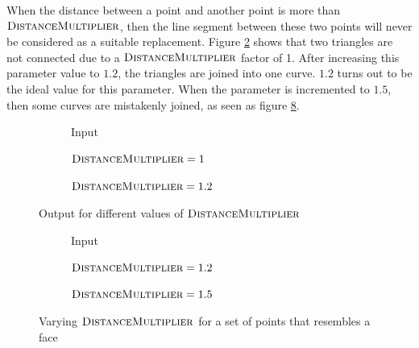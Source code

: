 \documentclass[11pt]{article}
\begin{document}
When the distance between a point and another point is more than $\textsc{DistanceMultiplier}$, then the line segment between these two points will never be considered as a suitable replacement. Figure \ref{fig:exp:multiple_length_factor:1} shows that two triangles are not connected due to a $\textsc{DistanceMultiplier}$ factor of 1. After increasing this parameter value to $1.2$, the triangles are joined into one curve. $1.2$ turns out to be the ideal value for this parameter. When the parameter is incremented to $1.5$, then some curves are mistakenly joined, as seen as figure \ref{fig:exp:multiple_face}.

\begingroup
{}%
\begin{figure}[ht!]
\centering
\begin{subfigure}{.33\linewidth}
\centering

\caption{Input}
\label{fig:exp:multiple_length_factor:input}
\end{subfigure}%
\begin{subfigure}{.33\linewidth}
\centering

\caption{$\textsc{DistanceMultiplier} = 1$}
\label{fig:exp:multiple_length_factor:1}
\end{subfigure}%
\begin{subfigure}{.33\linewidth}
\centering

\caption{$\textsc{DistanceMultiplier} = 1.2$}
\label{fig:exp:multiple_length_factor:1.2}
\end{subfigure}
\caption{Output for different values of $\textsc{DistanceMultiplier}$}
\label{fig:exp:multiple_length_factor}
\end{figure}
\endgroup
\begingroup
{}%
\begin{figure}[ht!]
\centering
\begin{subfigure}{.33\linewidth}
\centering

\caption{Input}
\label{fig:exp:multiple_face:input}
\end{subfigure}%
\begin{subfigure}{.33\linewidth}
\centering

\caption{$\textsc{DistanceMultiplier} = 1.2$}
\label{fig:exp:multiple_face:1.2}
\end{subfigure}%
\begin{subfigure}{.33\linewidth}
\centering

\caption{$\textsc{DistanceMultiplier} = 1.5$}
\label{fig:exp:multiple_face:1.5}
\end{subfigure}
\caption{Varying $\textsc{DistanceMultiplier}$ for a set of points that resembles a face}
\label{fig:exp:multiple_face}
\end{figure}
\endgroup
\end{document}
